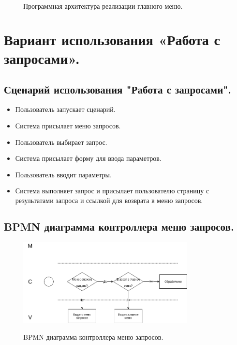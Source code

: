 \documentclass[12pt, a4paper]{article}
\begin{document}
\begin{figure}[ht!]
		\label{fig:pic3} %
		\caption{Программная архитектура реализации главного меню.}
	\end{figure}

   \section{Вариант использования «Работа с запросами».}
   \subsection{Сценарий использования "Работа с запросами".}
   \begin{itemize}
   	\item Пользователь запускает сценарий.
   	\item Система присылает меню запросов.
   	\item Пользователь выбирает запрос.
   	\item Система присылает форму для ввода параметров.
   	\item Пользователь вводит параметры.
   	\item Система выполняет запрос и присылает пользователю страницу с результатами
   	запроса и ссылкой для возврата в меню запросов.
   \end{itemize}
   
   \subsection{BPMN диаграмма контроллера меню запросов.}
   \begin{figure}[ht!]
   	\centering    %
   	\includegraphics[width=0.8\textwidth]{pictures/Requests_Controller.png}
   	\label{fig:pic4} %
   	\caption{BPMN диаграмма контроллера меню запросов.}
   \end{figure}
\end{document}
